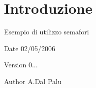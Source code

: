 \hypertarget{index_intro}{}\section{Introduzione}\label{index_intro}
Esempio di utilizzo semafori

\begin{DoxyDate}{Date}
02/05/2006 
\end{DoxyDate}
\begin{DoxyVersion}{Version}
0... 
\end{DoxyVersion}
\begin{DoxyAuthor}{Author}
A.\+Dal Palu 
\end{DoxyAuthor}
